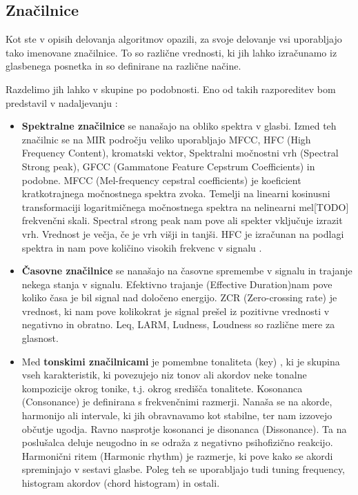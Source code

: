 \documentclass[a4paper, 12pt]{book}
\begin{document}
{\subsection{Značilnice}

Kot ste v opisih delovanja algoritmov opazili, za svoje delovanje vsi uporabljajo tako imenovane značilnice. To so različne vrednosti, ki jih lahko izračunamo iz glasbenega posnetka in so definirane na različne načine.

Razdelimo jih lahko v skupine po podobnosti. Eno od takih razporeditev \cite{laurier2007audio} \cite{bogdanov2013form} bom predstavil v nadaljevanju :

\begin{itemize}

  \item \textbf{Spektralne značilnice} se nanašajo na obliko spektra v glasbi. Izmed teh značilnic se na MIR področju veliko uporabljajo MFCC, HFC (High Frequency Content), kromatski vektor, Spektralni močnostni vrh (Spectral Strong peak), GFCC (Gammatone Feature Cepstrum Coefficients) in podobne. 
MFCC (Mel-frequency cepstral coefficients) \cite{gunderson2007musical} je koeficient kratkotrajnega močnostnega spektra zvoka. Temelji na linearni kosinusni transformaciji logaritmičnega močnostnega spektra na nelinearni mel[TODO] frekvenčni skali. Spectral strong peak \cite{gouyon2001exploration} nam pove ali spekter vključuje izrazit vrh. Vrednost je večja, če je vrh višji in tanjši. HFC je izračunan na podlagi spektra in nam pove količino visokih frekvenc v signalu \cite{brossier2004real}.

  \item \textbf{Časovne značilnice} se nanašajo na časovne spremembe v signalu in trajanje nekega stanja v signalu. Efektivno trajanje (Effective Duration)nam pove koliko časa je bil signal nad določeno energijo. ZCR (Zero-crossing rate) \cite{gouyon2000classifying} je vrednost, ki nam pove kolikokrat je signal prešel iz pozitivne vrednosti v negativno in obratno. Leq, LARM, Ludness, Loudness so različne mere za glasnost. 
  
  \item Med \textbf{tonskimi značilnicami} je pomembne tonaliteta (key) \cite{zhu2005music}, ki je skupina vseh karakteristik, ki povezujejo niz tonov ali akordov neke tonalne kompozicije okrog tonike, t.j. okrog središča tonalitete. Kosonanca  (Consonance) \cite{terhardt1974pitch} je definirana s frekvenčnimi razmerji. Nanaša se na akorde, harmonijo ali intervale, ki jih obravnavamo kot stabilne, ter nam izzovejo občutje ugodja. Ravno nasprotje kosonanci je disonanca (Dissonance). Ta na poslušalca deluje neugodno in se odraža z negativno psihofizično reakcijo. Harmonični ritem (Harmonic rhythm) \cite{la2001harmonic} je razmerje, ki pove kako se akordi spreminjajo v sestavi glasbe. Poleg teh se uporabljajo tudi tuning frequency, histogram akordov (chord histogram) in ostali.
  

\end{itemize}}
\end{document}
